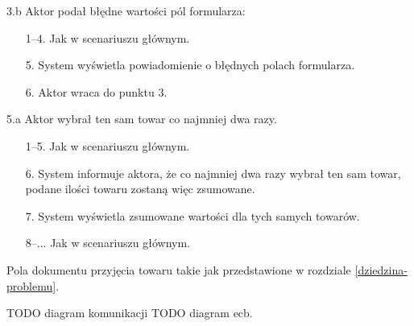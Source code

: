 \begin{usecase}
{\begin{enumerate}
      \end{enumerate}
    \item [3.b] Aktor podał błędne wartości pól formularza:
      \begin{enumerate}
        \item[1--4.] Jak w scenariuszu głównym.
        \item[5.] System wyświetla powiadomienie o błędnych polach formularza.
        \item[6.] Aktor wraca do punktu 3.
      \end{enumerate}
     \item[5.a] Aktor wybrał ten sam towar co najmniej dwa razy.
       \begin{enumerate}
       \item[1--5.] Jak w scenariuszu głównym.
       \item[6.] System informuje aktora, że co najmniej dwa razy wybrał ten sam towar, podane ilości towaru zostaną więc zsumowane.
       \item[7.] System wyświetla zsumowane wartości dla tych samych towarów.
       \item[8--...] Jak w scenariuszu głównym.
       \end{enumerate}
  }
   {
    Pola dokumentu przyjęcia towaru takie jak przedstawione w rozdziale \ref{dziedzina-problemu}.
  }
\end{usecase}
TODO diagram komunikacji
TODO diagram ecb.

